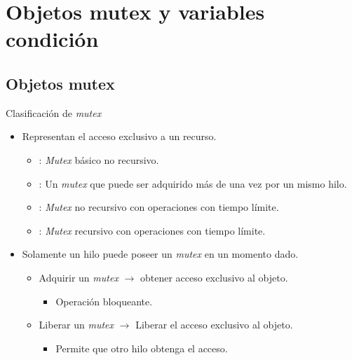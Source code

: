 \section{Objetos mutex y variables condición}

\subsection{Objetos mutex}

\begin{frame}{Clasificación de \emph{mutex}}
\begin{itemize}
  \item Representan el acceso exclusivo a un recurso.
    \begin{itemize}
      \item {}: \emph{Mutex} básico no recursivo.
      \item {}: Un \emph{mutex} que puede ser adquirido más de una vez por un mismo hilo.
      \item {}: \emph{Mutex} no recursivo con operaciones con tiempo límite.
      \item {}: \emph{Mutex} recursivo con operaciones con tiempo límite.
    \end{itemize}
  \item Solamente un hilo puede poseer un \emph{mutex} en un momento dado.
    \begin{itemize}
      \item Adquirir un \emph{mutex} $\rightarrow$ obtener acceso exclusivo al objeto.
        \begin{itemize}
          \item Operación bloqueante.
        \end{itemize}
      \item Liberar un \emph{mutex} $\rightarrow$ Liberar el acceso exclusivo al objeto.
        \begin{itemize}
          \item Permite que otro hilo obtenga el acceso.
        \end{itemize}
    \end{itemize}
\end{itemize}
\end{frame}

